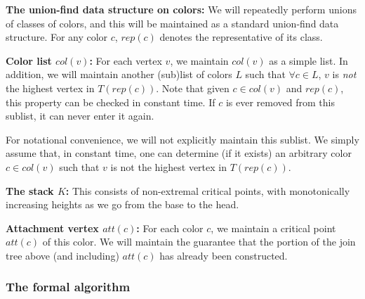 \documentclass[11pt]{article}
\newcommand{\ignore}[1]{}
\theoremstyle{definition}
\newcommand{\col}{col}
\newcommand{\h}{att}
\newcommand{\mcol}{mcol}
\newcommand{\rep}{rep}
\newcommand{\stack}{K}
\begin{document}
\medskip
\noindent
{\bf The union-find data structure on colors:} We will repeatedly perform unions
of classes of colors, and this will be maintained as a standard union-find data structure.
For any color $c$, $\rep(c)$ denotes the representative of its class. 

\medskip
\noindent
{\bf Color list $\col(v)$:} For each vertex $v$, we maintain $\col(v)$ as a simple list.
In addition, we will maintain another (sub)list of colors $L$ such that $\forall c \in L$,
$v$ is \emph{not} the highest vertex in $T(\rep(c))$. Note that given $c \in \col(v)$
and $\rep(c)$, this property can be checked in constant time. If $c$ is ever removed
from this sublist, it can never enter it again.

For notational convenience, we will not explicitly
maintain this sublist. We simply assume that, in constant
time, one can determine (if it exists) an arbitrary color $c \in \col(v)$ such that $v$ is not the highest vertex in $T(\rep(c))$.

\medskip
\noindent
{\bf The stack $\stack$:} This consists of non-extremal critical points, with monotonically increasing
heights as we go from the base to the head.
\ignore{
Each point $x \in \stack$ has an associated subset of $\col(x)$, denoted $\mcol(x)$.
Both $\mcol(x)$ and its complement are stored as hash table. So lookups, inserts, and deletes
are in these sets are all constant time operations. The stack is guaranteed to satisfy 
the following invariants.
\begin{asparaitem}
	\item For every $x \in \stack$: For every $c \in \mcol(x)$, $x$ is the highest element
	in $T(c)$. Furthermore, $c = \rep(c)$.
	\item Consider $x, y \in \stack$ such that $y$ was pushed on $x$. There exists $c \in \col(x) \setminus
	\mcol(x)$ such that $x$ is not highest in $T(c)$ but $y$ is highest in $T(c)$.
\end{asparaitem}
}

\medskip
\noindent
{\bf Attachment vertex $\h(c)$:} For each color $c$, we maintain a critical point $\h(c)$ of this color.
We will maintain the guarantee that the portion of the join tree above (and including) $\h(c)$ has already been constructed.

\subsubsection{The formal algorithm} \label{sec:algorithm}
\end{document}
